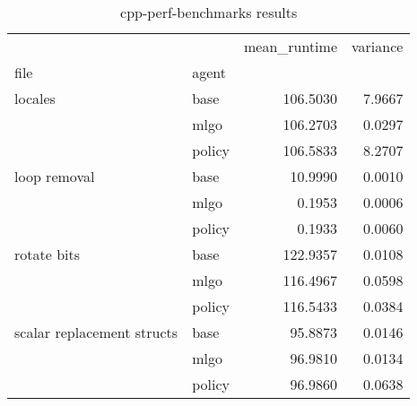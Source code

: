 \begin{table}[h]
    \caption{cpp-perf-benchmarks results}
    \label{table:cpp-perf-benchmarks}
\begin{tabular}{llrr}
\toprule
                           &        &  mean\_runtime &  variance \\
file & agent &               &           \\
\midrule
locales & base &      106.5030 &    7.9667 \\
                           & mlgo &      106.2703 &    0.0297 \\
                           & policy &      106.5833 &    8.2707 \\
loop removal & base &       10.9990 &    0.0010 \\
                           & mlgo &        0.1953 &    0.0006 \\
                           & policy &        0.1933 &    0.0060 \\
rotate bits & base &      122.9357 &    0.0108 \\
                           & mlgo &      116.4967 &    0.0598 \\
                           & policy &      116.5433 &    0.0384 \\
scalar replacement structs & base &       95.8873 &    0.0146 \\
                           & mlgo &       96.9810 &    0.0134 \\
                           & policy &       96.9860 &    0.0638 \\
\bottomrule
\end{tabular}
\end{table}
